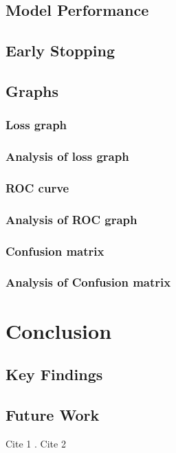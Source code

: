 \documentclass[a4paper,oneside,11pt]{book}
\begin{document}
\section{Model Performance}
\section{Early Stopping}
\section{Graphs}
\subsection{Loss graph}
\subsection{Analysis of loss graph}
\subsection{ROC curve}
\subsection{Analysis of ROC graph}
\subsection{Confusion matrix}
\subsection{Analysis of Confusion matrix}

\chapter{Conclusion}
\section{Key Findings}
\section{Future Work}

Cite 1 \cite{AUT2018}. \vspace{0.25cm}
\noindent Cite 2 \cite{AUT1999}


\end{document}
